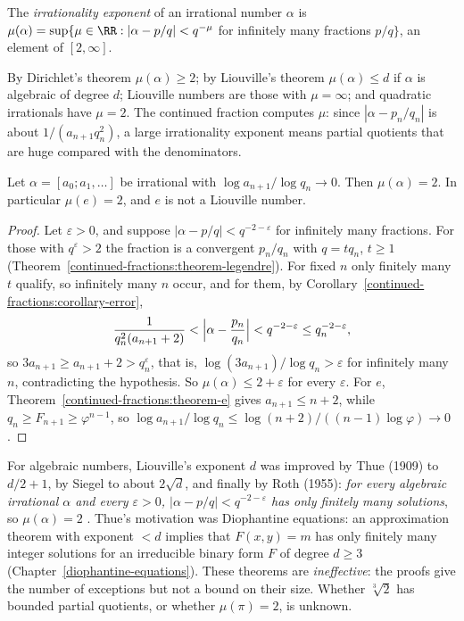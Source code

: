 \begin{definition}\label{continued-fractions:definition-irrationality-exponent}
The \emph{irrationality exponent} of an irrational number $\alpha$ is $\mu(\alpha) = \sup\{\mu \in \RR : |\alpha - p/q| < q^{-\mu}$ for infinitely many fractions $p/q\}$, an element of
$[2, \infty]$.
\end{definition}

By Dirichlet's theorem $\mu(\alpha) \geq 2$; by Liouville's theorem $\mu(\alpha) \leq d$ if $\alpha$ is algebraic of degree $d$; Liouville numbers are those with $\mu = \infty$; and quadratic
irrationals have $\mu = 2$. The continued fraction computes $\mu$: since $|\alpha - p_n/q_n|$ is about $1/(a_{n+1}q_n^2)$, a large irrationality exponent means partial quotients that are huge
compared with the denominators.

\begin{proposition}\label{continued-fractions:proposition-irrationality-exponent-e}
Let $\alpha = [a_0; a_1, \ldots]$ be irrational with $\log a_{n+1}/\log q_n \to 0$. Then $\mu(\alpha) = 2$. In particular $\mu(e) = 2$, and $e$ is not a Liouville number.
\end{proposition}

\begin{proof}
Let $\varepsilon > 0$, and suppose $|\alpha - p/q| < q^{-2-\varepsilon}$ for infinitely many fractions. For those with $q^\varepsilon > 2$ the fraction is a convergent $p_n/q_n$ with $q = tq_n$, $t \geq 1$
(Theorem~\ref{continued-fractions:theorem-legendre}). For fixed $n$ only finitely many $t$ qualify, so infinitely many $n$ occur, and for them, by Corollary~\ref{continued-fractions:corollary-error},
\[
\frac{1}{q_n^2(a_{n+1} + 2)} < \Bigl|\alpha - \frac{p_n}{q_n}\Bigr| < q^{-2-\varepsilon} \leq q_n^{-2-\varepsilon},
\]
so $3a_{n+1} \geq a_{n+1} + 2 > q_n^\varepsilon$, that is, $\log(3a_{n+1})/\log q_n > \varepsilon$ for infinitely many $n$, contradicting the hypothesis. So $\mu(\alpha) \leq 2 + \varepsilon$ for every
$\varepsilon$. For $e$, Theorem~\ref{continued-fractions:theorem-e} gives $a_{n+1} \leq n + 2$, while $q_n \geq F_{n+1} \geq \varphi^{n-1}$, so $\log a_{n+1}/\log q_n \leq \log(n + 2)/((n - 1)\log\varphi) \to 0$.
\end{proof}

\begin{remark}\label{continued-fractions:remark-roth}
For algebraic numbers, Liouville's exponent $d$ was improved by Thue (1909) to $d/2 + 1$, by Siegel to about $2\sqrt d$, and finally by Roth (1955): \emph{for every algebraic irrational $\alpha$ and
every $\varepsilon > 0$, $|\alpha - p/q| < q^{-2-\varepsilon}$ has only finitely many solutions}, so $\mu(\alpha) = 2$ \cite{roth-1955}. Thue's motivation was Diophantine equations: an approximation
theorem with exponent $< d$ implies that $F(x, y) = m$ has only finitely many integer solutions for an irreducible binary form $F$ of degree $d \geq 3$ (Chapter~\ref{diophantine-equations}). These
theorems are \emph{ineffective}: the proofs give the number of exceptions but not a bound on their size. Whether $\sqrt[3]2$ has bounded partial quotients, or whether $\mu(\pi) = 2$, is unknown.
\end{remark}

